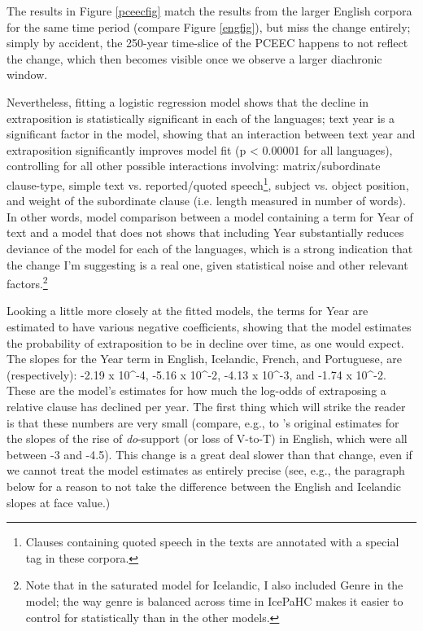 \noindent The results in Figure \ref{pceecfig} match the results from the larger English corpora for the same time period (compare Figure \ref{engfig}), but miss the change entirely; simply by accident, the 250-year time-slice of the PCEEC happens to not reflect the change, which then becomes visible once we observe a larger diachronic window.

Nevertheless, fitting a logistic regression model shows that the decline in extraposition is statistically significant in each of the languages; text year is a significant factor in the model, showing that an interaction between text year and extraposition significantly improves model fit (p < 0.00001 for all languages), controlling for all other possible interactions involving: matrix/subordinate clause-type, simple text vs. reported/quoted speech\footnote{Clauses containing quoted speech in the texts are annotated with a special tag in these corpora.}, subject vs. object position, and weight of the subordinate clause (i.e. length measured in number of words). In other words, model comparison between a model containing a term for Year of text and a model that does not shows that including Year substantially reduces deviance of the model for each of the languages, which is a strong indication that the change I'm suggesting is a real one, given statistical noise and other relevant factors.\footnote{Note that in the saturated model for Icelandic, I also included Genre in the model; the way genre is balanced across time in IcePaHC makes it easier to control for statistically than in the other models.}

Looking a little more closely at the fitted models, the terms for Year are estimated to have various negative coefficients, showing that the model estimates the probability of extraposition to be in decline over time, as one would expect. The slopes for the Year term in English, Icelandic, French, and Portuguese, are (respectively): -2.19 x 10^{-4}, -5.16 x 10^{-2}, -4.13 x 10^{-3}, and -1.74 x 10^{-2}. These are the model's estimates for how much the log-odds of extraposing a relative clause has declined per year. The first thing which will strike the reader is that these numbers are very small (compare, e.g., to \citealt{kroch1989}'s original estimates for the slopes of the rise of \textsl{do}-support (or loss of V-to-T) in English, which were all between -3 and -4.5). This change is a great deal slower than that change, even if we cannot treat the model estimates as entirely precise (see, e.g., the paragraph below for a reason to not take the difference between the English and Icelandic slopes at face value.)

